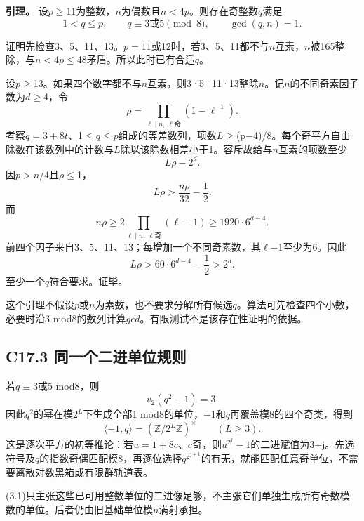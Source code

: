 \documentclass[11pt,a4paper]{article}
\theoremstyle{definition}
\numberwithin{equation}{section}
\begin{document}
\textbf{{引理。}} {设\ensuremath{p}\ensuremath{\ge}11为整数，\ensuremath{n}为偶数且\ensuremath{n<4p}。则存在奇整数\ensuremath{q}满足} \[
1<q\le p,\qquad q\equiv3\text{或}5\pmod8,\qquad\gcd(q,n)=1.
\tag{C17.2.1}
\]

{证明先检查3、5、11、13。\ensuremath{p=11}或12时，若3、5、11都不与\ensuremath{n}互素，\ensuremath{n}被165整除，与\ensuremath{n<4p}\ensuremath{\le}48矛盾。所以此时已有合适\ensuremath{q}。}

{设\ensuremath{p}\ensuremath{\ge}13。如果四个数字都不与\ensuremath{n}互素，则3·5·11·13整除\ensuremath{n}。记\ensuremath{n}的不同奇素因子数为\ensuremath{d}\ensuremath{\ge}4，令} \[
\rho=\prod_{\ell\mid n,\ \ell\text{奇}}(1-\ell^{-1}).
\] {考察\ensuremath{q=3+8t}、1\ensuremath{\le}\ensuremath{q}\ensuremath{\le}\ensuremath{p}组成的等差数列，项数\ensuremath{L}\ensuremath{\ge}(p−4)/8。每个奇平方自由除数在该数列中的计数与\ensuremath{L}除以该除数相差小于1。容斥故给与\ensuremath{n}互素的项数至少} \[
L\rho-2^d.
\] {因\ensuremath{p>n/4}且\ensuremath{\rho }\ensuremath{\le}1，} \[
L\rho>\frac{n\rho}{32}-\frac12.
\] {而} \[
n\rho\ge2\prod_{\ell\mid n,\ \ell\text{奇}}(\ell-1)
\ge1920\cdot6^{d-4}.
\] {前四个因子来自3、5、11、13；每增加一个不同奇素数，其\ensuremath{\ell}−1至少为6。因此} \[
L\rho>60\cdot6^{d-4}-\frac12>2^d.
\] {至少一个\ensuremath{q}符合要求。证毕。}

{这个引理不假设\ensuremath{p}或\ensuremath{n}为素数，也不要求分解所有候选\ensuremath{q}。算法可先检查四个小数，必要时沿3} {mod8的数列计算\ensuremath{gcd}。有限测试不是该存在性证明的依据。}

\subsection*{\texorpdfstring{{C17.3} {同一个二进单位规则}}{C17.3 同一个二进单位规则}}\label{C17-h125}

{若\ensuremath{q}\ensuremath{\equiv}3或5} {mod8，则} \[
v_2(q^2-1)=3.
\] {因此\ensuremath{q^{2}}的幂在模\ensuremath{2^L}下生成全部1} {mod8的单位，−1和\ensuremath{q}再覆盖模8的四个奇类，得到} \[
\boxed{\langle-1,q\rangle=(\mathbb Z/2^L\mathbb Z)^\times
\qquad(L\ge3).}
\tag{C17.3.1}
\] {这是逐次平方的初等推论：若\ensuremath{u=1+8c}、\ensuremath{c}奇，则\ensuremath{u^{2^{j}}-1}的二进赋值为3+j。先选符号及\ensuremath{q}的指数奇偶匹配模8，再逐位选择\ensuremath{q^{2^{j+1}}}的有无，就能匹配任意奇单位，不需要离散对数黑箱或有限群轨道表。}

{(3.1)只主张这些已可用整数单位的二进像足够，不主张它们单独生成所有奇数模数的单位。后者仍由旧基础单位模\ensuremath{n}满射承担。}
\end{document}
